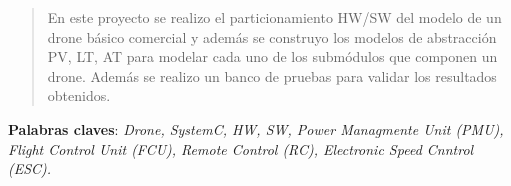 \begin{abstract}
En este proyecto se realizo el particionamiento HW/SW del modelo de un drone básico comercial y además se construyo los modelos de abstracción  PV, LT, AT para modelar cada uno de los submódulos que componen un drone. Además se realizo un banco de pruebas para validar los resultados obtenidos. 
\end{abstract}


\vspace*{0.0cm}
\begin{small}
\textbf{Palabras claves}: \textit{Drone, SystemC, HW, SW, Power Managmente Unit (PMU), Flight Control Unit (FCU), Remote Control (RC), Electronic Speed Cnntrol (ESC).}
\end{small}
